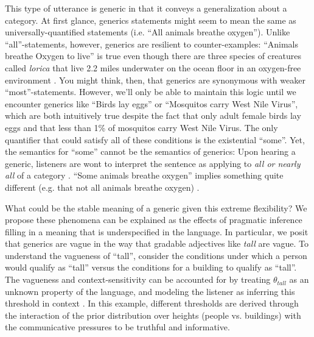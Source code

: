 \documentclass[10pt,letterpaper]{article}
\newcommand{\red}[1]{\textcolor{Red}{#1}}
\begin{document}
This type of utterance is generic \cite{Carlson1977, Leslie2008} in that it conveys a generalization about a category. At first glance, generics statements might seem to mean the same as universally-quantified statements (i.e. ``All animals breathe oxygen''). Unlike ``all''-statements, however, generics are resilient to counter-examples: ``Animals breathe Oxygen to live'' is true even though there are three species of creatures called \emph{lorica} that live 2.2 miles underwater on the ocean floor in an oxygen-free environment \cite{Danovaro2010}. You might think, then, that generics are synonymous with weaker ``most''-statements. However, we'll only be able to maintain this logic until we encounter generics like ``Birds lay eggs'' or ``Mosquitos carry West Nile Virus'', which are both intuitively true despite the fact that only adult female birds lay eggs and that less than 1\% of mosquitos carry West Nile Virus. The only quantifier that could satisfy all of these conditions is the existential ``some''.  Yet, the semantics for ``some'' cannot be the semantics of generics:  Upon hearing a generic, listeners are wont to interpret the sentence as applying to \emph{all or nearly all} of a category \cite{Gelman2002, Cimpian2010}. ``Some animals breathe oxygen'' implies something quite different (e.g. that not all animals breathe oxygen) \cite{Degen2015}.


%
%
%
%

What could be the stable meaning of a generic given this extreme flexibility? We propose these phenomena can be explained as the effects of pragmatic inference filling in a meaning that is underspecified in the language. 
%
In particular, we posit that generics are vague in the way that gradable adjectives like \emph{tall} are vague. To understand the vagueness of ``tall'', consider the conditions under which a person would qualify as ``tall'' versus the conditions for a building to qualify as ``tall''.
The vagueness and context-sensitivity can be accounted for by treating $\theta_{tall}$ as an unknown property of the language, and modeling the listener as inferring this threshold in context \cite{Lassiter2015}. In this example, different thresholds are derived through the interaction of the prior distribution over heights (people vs. buildings) with the communicative pressures to be truthful and informative. 
 
\end{document}

